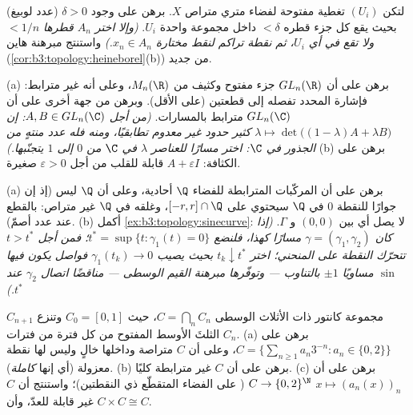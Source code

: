 \begin{exercise}[$\star\star$]\label{exo:b3:topology:7}
(عدد لوبيغ) لتكن $(U_i)$ تغطية مفتوحة لفضاء متري متراص $X$.
برهن على وجود $\delta > 0$ بحيث يقع كل جزء قطره $< \delta$ داخل
مجموعة واحدة $U_i$. \emph{(وإلا اختر $A_n$ قطرها $< 1/n$ ولا تقع
في أي $U_i$، ثم نقطة تراكم لنقط مختارة $x_n \in A_n$.)} واستنتج
مبرهنة هاين (\cref{cor:b3:topology:heineborel}(b)) من جديد.
\end{exercise}

\begin{exercise}[$\star\star$]\label{exo:b3:topology:8}
(a) برهن على أن $GL_n(\R)$ جزء مفتوح وكثيف من $M_n(\R)$، وعلى
أنه غير مترابط: فإشارة المحدد تفصله إلى قطعتين (على الأقل).
وبرهن من جهة أخرى على أن $GL_n(\C)$ مترابط بالمسارات.
\emph{(من أجل $A, B \in GL_n(\C)$: إن $\lambda \mapsto \det\bigl((1 -
\lambda)A + \lambda B\bigr)$ كثير حدود غير معدوم تطابقيًا،
ومنه فله عدد منتهٍ من الجذور في $\C$: اختر مسارًا للعناصر
$\lambda$ في $\C$ من $0$ إلى $1$ يتجنّبها.)}
(b) برهن على الكثافة: $A + \varepsilon I$ قابلة للقلب من أجل $\varepsilon > 0$ صغيرة.
\end{exercise}

\begin{exercise}[$\star\star$]\label{exo:b3:topology:9}
(a) برهن على أن المركّبات المترابطة للفضاء $\Q$ أحادية، وعلى أن
$\Q$ ليس  (إذ إن جوارًا  للنقطة $0$ في
$\Q$ سيحتوي على $[-r, r]\cap\Q$، وغلقه في $\Q$ غير متراص:
بالقطع عند عدد أصمّ).
(b) أكمل \cref{ex:b3:topology:sinecurve}: لا يصل أي  بين $(0,0)$ و $\Gamma$.
\emph{(إذا كان $\gamma = (\gamma_1, \gamma_2)$ مسارًا كهذا، فلنضع $t^* = \sup\{t : \gamma_1(t) = 0\}$؛ فمن أجل
$t
> t^*$ تتحرّك النقطة على المنحني؛ اختر $t_k \downarrow
t^*$ بحيث يصيب
$\gamma_1(t_k) \to 0$ فواصل يكون فيها $\sin$ مساويًا $\pm1$ بالتناوب --- وتوفّرها
مبرهنة القيم الوسطى --- مناقضًا اتصال $\gamma_2$ عند $t^*$.)}
\end{exercise}

\begin{exercise}[$\star\star\star$]\label{exo:b3:topology:10}
مجموعة كانتور ذات الأثلاث الوسطى $C = \bigcap_n C_n$، حيث $C_0 =
[0,1]$ وتنزع
$C_{n+1}$ الثلثَ الأوسط المفتوح من كل فترة من فترات $C_n$.
(a) برهن على $C = \bigl\{\sum_{n\geq1} a_n3^{-n} : a_n \in
\{0,2\}\bigr\}$، وعلى أن $C$ متراصة وداخلها خالٍ وليس لها
نقطة معزولة (أي إنها \emph{كاملة}).
(b) برهن على أن $C$ غير مترابطة كليًا.
(c) برهن على أن $x \mapsto (a_n(x))_n$  $C \to
\{0,2\}^\N$ ( على الفضاء المتقطّع ذي النقطتين)؛ واستنتج أن $C$ غير
قابلة للعدّ، وأن $C \times C
\cong C$.
\end{exercise}

